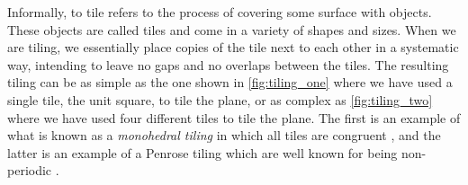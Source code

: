 \documentclass[../thesis.tex]{subfiles}
\begin{document}





Informally, to tile refers to the process of covering some surface with objects. These objects are called tiles and come in a variety of shapes and sizes. When we are tiling, we essentially place copies of the tile next to each other in a systematic way, intending to leave no gaps and no overlaps between the tiles. The resulting tiling can be as simple as the one shown in \cref{fig:tiling_one} where we have used a single tile, the unit square, to tile the plane, or as complex as \cref{fig:tiling_two} where we have used four different tiles to tile the plane. The first is an example of what is known as a \emph{monohedral tiling} in which all tiles are congruent \cite[p. 20]{grunbaumTilingsPatterns1987}, and the latter is an example of a Penrose tiling which are well known for being non-periodic \cite{penrosePentaplexityClassNonPeriodic1979}. %


\end{document}

